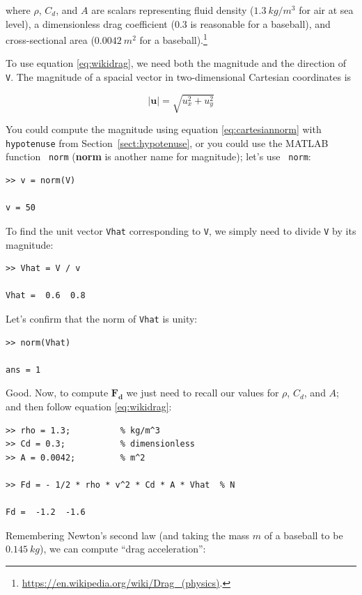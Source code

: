 \documentclass[
]{book}
\renewcommand{\vec}[1]{\bm{\mathbf{#1}}}
\newcommand{\norm}[1]{\lvert #1 \rvert}
\begin{document}
where $\rho$, $C_d$, and $A$ are scalars representing fluid density
($1.3 ~ kg/m^3$ for air at sea level), a dimensionless drag coefficient
($0.3$ is reasonable for a baseball), and cross-sectional area ($0.0042
~ m^2$ for a baseball).\footnote{
    \url{https://en.wikipedia.org/wiki/Drag_(physics)}.}

To use equation \eqref{eq:wikidrag}, we need both the magnitude and the
direction of {\tt V}. The magnitude of a spacial vector \vec{u} in
two-dimensional Cartesian coordinates is

\begin{equation}\label{eq:cartesiannorm}
    \norm{\vec{u}} = \sqrt{u_x^2 + u_y^2}
\end{equation}

You could compute the magnitude using equation
\eqref{eq:cartesiannorm} with {\tt hypotenuse} from
Section~\ref{sect:hypotenuse}, or you could use the MATLAB function {\tt
norm} ({\bf norm} is another name for magnitude); let's use {\tt
norm}:

\begin{verbatim}
>> v = norm(V)

v = 50
\end{verbatim}

To find the unit vector {\tt Vhat} corresponding to {\tt V}, we simply
need to divide {\tt V} by its magnitude:

\begin{verbatim}
>> Vhat = V / v

Vhat =  0.6  0.8
\end{verbatim}

Let's confirm that the norm of {\tt Vhat} is unity:

\begin{verbatim}
>> norm(Vhat)

ans = 1
\end{verbatim}

Good. Now, to compute $\vec{F_d}$ we just need to recall our values for
$\rho$, $C_d$, and $A$; and then follow equation \eqref{eq:wikidrag}:

\begin{verbatim}
>> rho = 1.3;          % kg/m^3
>> Cd = 0.3;           % dimensionless
>> A = 0.0042;         % m^2

>> Fd = - 1/2 * rho * v^2 * Cd * A * Vhat  % N

Fd =  -1.2  -1.6
\end{verbatim}

Remembering Newton's second law (and taking the mass $m$ of a baseball to be
$0.145 ~ kg$), we can compute ``drag acceleration'':
\end{document}
